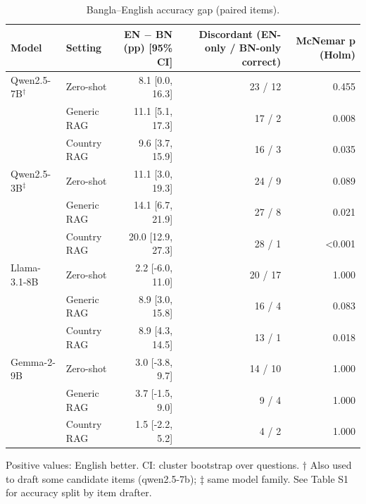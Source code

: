 \begin{table}[t]
\centering
\footnotesize
\caption{Bangla--English accuracy gap (paired items).}
\label{tab:gap}
\begin{tabular}{llrrr}
\toprule
Model & Setting & EN $-$ BN (pp) [95\% CI] & Discordant (EN-only / BN-only correct) & McNemar p (Holm) \\
\midrule
Qwen2.5-7B$^\dagger$ & Zero-shot & 8.1 [0.0, 16.3] & 23 / 12 & 0.455 \\
 & Generic RAG & 11.1 [5.1, 17.3] & 17 / 2 & 0.008 \\
 & Country RAG & 9.6 [3.7, 15.9] & 16 / 3 & 0.035 \\
\addlinespace
Qwen2.5-3B$^\ddagger$ & Zero-shot & 11.1 [3.0, 19.3] & 24 / 9 & 0.089 \\
 & Generic RAG & 14.1 [6.7, 21.9] & 27 / 8 & 0.021 \\
 & Country RAG & 20.0 [12.9, 27.3] & 28 / 1 & <0.001 \\
\addlinespace
Llama-3.1-8B & Zero-shot & 2.2 [-6.0, 11.0] & 20 / 17 & 1.000 \\
 & Generic RAG & 8.9 [3.0, 15.8] & 16 / 4 & 0.083 \\
 & Country RAG & 8.9 [4.3, 14.5] & 13 / 1 & 0.018 \\
\addlinespace
Gemma-2-9B & Zero-shot & 3.0 [-3.8, 9.7] & 14 / 10 & 1.000 \\
 & Generic RAG & 3.7 [-1.5, 9.0] & 9 / 4 & 1.000 \\
 & Country RAG & 1.5 [-2.2, 5.2] & 4 / 2 & 1.000 \\
\bottomrule
\end{tabular}
\par\smallskip\parbox{\linewidth}{\scriptsize Positive values: English better. CI: cluster bootstrap over questions. † Also used to draft some candidate items (qwen2.5-7b); ‡ same model family. See Table S1 for accuracy split by item drafter.}
\end{table}

